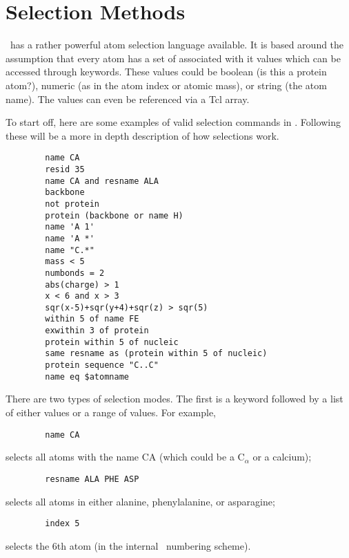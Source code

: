 %
%
%


\section{Selection Methods}
\label{ug:topic:selections}

\VMD\ has a rather powerful atom selection language available.  It is
based around the assumption that every atom has a set of associated with it 
values which can be
accessed through 
keywords.  These values could be
boolean (is this a protein atom?), numeric (as in the atom
index or atomic mass), or string (the atom name).  The values can
even be referenced via a Tcl array.

To start off, here are some examples of valid selection commands in
\VMD.  Following these will be a more in depth description of how
selections work.

\begin{verbatim}
        name CA
        resid 35
        name CA and resname ALA
        backbone
        not protein
        protein (backbone or name H)
        name 'A 1'
        name 'A *'
        name "C.*"
        mass < 5
        numbonds = 2
        abs(charge) > 1
        x < 6 and x > 3
        sqr(x-5)+sqr(y+4)+sqr(z) > sqr(5)
        within 5 of name FE
        exwithin 3 of protein
        protein within 5 of nucleic
        same resname as (protein within 5 of nucleic)
        protein sequence "C..C"
        name eq $atomname 
\end{verbatim}

There are two types of selection modes.  The first is a keyword
followed by a list of either values or a range of values.  For example,
\begin{verbatim}
        name CA
\end{verbatim}
selects all atoms with the name CA (which could be a C${}_\alpha$ or a calcium);
\begin{verbatim}
        resname ALA PHE ASP
\end{verbatim}
selects all atoms in either alanine, phenylalanine, or asparagine;
\begin{verbatim}
        index 5
\end{verbatim}
selects the 6th atom (in the internal \VMD\ numbering scheme).

